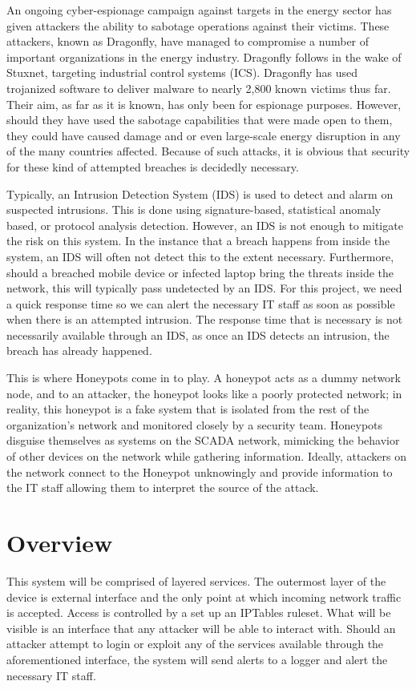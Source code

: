 An ongoing cyber-espionage campaign against targets in the energy sector has given attackers the ability to sabotage operations against their victims. These attackers, known as Dragonfly, have managed to compromise a number of important organizations in the energy industry. Dragonfly follows in the wake of Stuxnet, targeting industrial control systems (ICS). Dragonfly has used trojanized software to deliver malware to nearly 2,800 known victims thus far. Their aim, as far as it is known, has only been for espionage purposes. However, should they have used the sabotage capabilities that were made open to them, they could have caused damage and or even large-scale energy disruption in any of the many countries affected. Because of such attacks, it is obvious that security for these kind of attempted breaches is decidedly necessary. 

Typically, an Intrusion Detection System (IDS) is used to detect and alarm on suspected intrusions. This is done using signature-based, statistical anomaly based, or protocol analysis detection. However, an IDS is not enough to mitigate the risk on this system. In the instance that a breach happens from inside the system, an IDS will often not detect this to the extent necessary. Furthermore, should a breached mobile device or infected laptop bring the threats inside the network, this will typically pass undetected by an IDS. For this project, we need a quick response time so we can alert the necessary IT staff as soon as possible when there is an attempted intrusion. The response time that is necessary is not necessarily available through an IDS, as once an IDS detects an intrusion, the breach has already happened.

This is where Honeypots come in to play. A honeypot acts as a dummy network node, and to an attacker, the honeypot looks like a poorly protected network; in reality, this honeypot is a fake system that is isolated from the rest of the organization’s network and monitored closely by a security team. Honeypots disguise themselves as systems on the SCADA network, mimicking the behavior of other devices on the network while gathering information. Ideally, attackers on the network connect to the Honeypot unknowingly and provide information to the IT staff allowing them to interpret the source of the attack.

\section{Overview}
This system will be comprised of layered services. The outermost layer of the device is external interface and the only point at which incoming network traffic is accepted.
Access is controlled by a set up an IPTables ruleset. What will be visible is an interface that any attacker will be able to interact with. Should an attacker attempt to login or exploit any of the services available through the aforementioned interface, the system will send alerts to a logger and alert the necessary IT staff.

